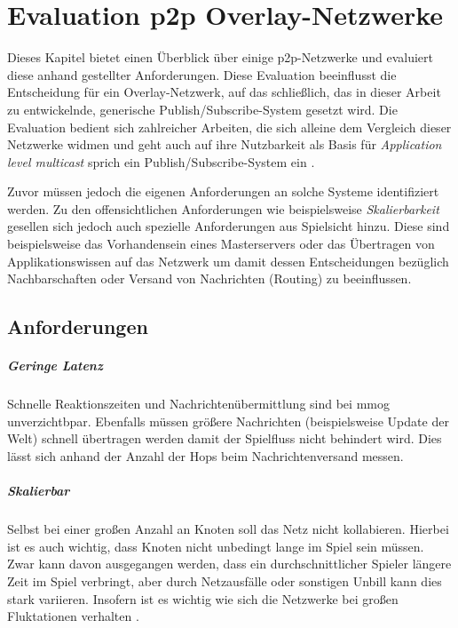 \chapter{Evaluation p2p Overlay-Netzwerke}
\label{chap:evaluation_p2p}

Dieses Kapitel bietet einen Überblick über einige p2p-Netzwerke und evaluiert diese anhand gestellter Anforderungen. Diese Evaluation beeinflusst die Entscheidung für ein Overlay-Netzwerk, auf das schließlich, das in dieser Arbeit zu entwickelnde, generische Publish/Subscribe-System gesetzt wird. Die Evaluation bedient sich zahlreicher Arbeiten, die sich alleine dem Vergleich dieser Netzwerke widmen \cite{Lua2005Survey, Goetz2005, Li2004Comparing, Darlagiannis2006Peertopeer, Castro2002Secure, Bo2003PeertoPeer} und geht auch auf ihre Nutzbarkeit als Basis für \emph{Application level multicast} sprich ein Publish/Subscribe-System ein \cite{Hosseini2007Survey, Fahmy2007, Castro2003Evaluation, Ratnasamy2001}.

Zuvor müssen jedoch die eigenen Anforderungen an solche Systeme identifiziert werden. Zu den offensichtlichen Anforderungen wie beispielsweise \emph{Skalierbarkeit} gesellen sich jedoch auch spezielle Anforderungen aus Spielsicht hinzu. Diese sind beispielsweise das Vorhandensein eines Masterservers oder das Übertragen von Applikationswissen auf das Netzwerk um damit dessen Entscheidungen bezüglich Nachbarschaften oder Versand von Nachrichten (Routing) zu beeinflussen.

\section{Anforderungen}

\paragraph{Geringe Latenz} Schnelle Reaktionszeiten und Nachrichtenübermittlung sind bei \ac{mmog} unverzichtbpar. Ebenfalls müssen größere Nachrichten (beispielsweise Update der Welt) schnell übertragen werden damit der Spielfluss nicht behindert wird. Dies lässt sich anhand der Anzahl der Hops beim Nachrichtenversand messen.

\paragraph{Skalierbar} Selbst bei einer großen Anzahl an Knoten soll das Netz nicht kollabieren. Hierbei ist es auch wichtig, dass Knoten nicht unbedingt lange im Spiel sein müssen. Zwar kann davon ausgegangen werden, dass ein durchschnittlicher Spieler längere Zeit im Spiel verbringt, aber durch Netzausfälle oder sonstigen Unbill kann dies stark variieren. Insofern ist es wichtig wie sich die Netzwerke bei großen Fluktationen verhalten \cite{Li2004Comparing}.

